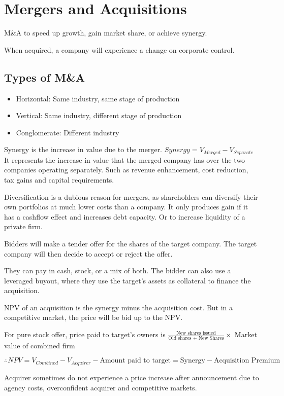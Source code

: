 \section{Mergers and Acquisitions}
M\&A to speed up growth, gain market share, or achieve synergy.

When acquired, a company will experience a change on corporate control.

\subsection{Types of M\&A}
\begin{itemize}
    \item Horizontal: Same industry, same stage of production
    \item Vertical: Same industry, different stage of production
    \item Conglomerate: Different industry
\end{itemize}

Synergy is the increase in value due to the merger.
$Synergy = V_{Merged} - V_{Separate}$
It represents the increase in value that the merged company has over the two companies operating separately. Such as revenue enhancement, cost reduction, tax gains and capital requirements.

Diversification is a dubious reason for mergers, as shareholders can diversify their own portfolios at much lower costs than a company.
It only produces gain if it has a cashflow effect and increases debt capacity. Or to increase liquidity of a private firm.

Bidders will make a tender offer for the shares of the target company. The target company will then decide to accept or reject the offer.

They can pay in cash, stock, or a mix of both. The bidder can also use a leveraged buyout, where they use the target's assets as collateral to finance the acquisition.

NPV of an acquisition is the synergy minus the acquisition cost. But in a competitive market, the price will be bid up to the NPV. 

For pure stock offer, price paid to target's owners is $\frac{\text{New shares issued}}{\text{Old shares + New Shares}} \times$ Market value of combined firm

$\therefore NPV = V_{Combined} - V_{Acquirer} - \text{Amount paid to target} = \text{Synergy}-\text{Acquisition Premium}$

Acquirer sometimes do not experience a price increase after announcement due to agency costs, overconfident acquirer and competitive markets.

